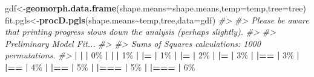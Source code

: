 \documentclass[
]{book}
\newenvironment{Shaded}{\begin{snugshade}}{\end{snugshade}}
\newcommand{\AttributeTok}[1]{\textcolor[rgb]{0.13,0.29,0.53}{#1}}
\newcommand{\CommentTok}[1]{\textcolor[rgb]{0.56,0.35,0.01}{\textit{#1}}}
\newcommand{\DecValTok}[1]{\textcolor[rgb]{0.00,0.00,0.81}{#1}}
\newcommand{\ErrorTok}[1]{\textcolor[rgb]{0.64,0.00,0.00}{\textbf{#1}}}
\newcommand{\FunctionTok}[1]{\textcolor[rgb]{0.13,0.29,0.53}{\textbf{#1}}}
\newcommand{\NormalTok}[1]{#1}
\newcommand{\OtherTok}[1]{\textcolor[rgb]{0.56,0.35,0.01}{#1}}
\newcommand{\SpecialCharTok}[1]{\textcolor[rgb]{0.81,0.36,0.00}{\textbf{#1}}}
\begin{document}
\begin{Shaded}
\begin{Highlighting}[]
\NormalTok{gdf}\OtherTok{\textless{}{-}}\FunctionTok{geomorph.data.frame}\NormalTok{(}\AttributeTok{shape.means=}\NormalTok{shape.means,}\AttributeTok{temp=}\NormalTok{temp,}\AttributeTok{tree=}\NormalTok{tree)}
\NormalTok{fit.pgls}\OtherTok{\textless{}{-}}\FunctionTok{procD.pgls}\NormalTok{(shape.means}\SpecialCharTok{\textasciitilde{}}\NormalTok{temp,tree,}\AttributeTok{data=}\NormalTok{gdf)}
\CommentTok{\#\textgreater{} }
\CommentTok{\#\textgreater{} Please be aware that printing progress slows down the analysis (perhaps slightly).}
\CommentTok{\#\textgreater{} }
\CommentTok{\#\textgreater{} Preliminary Model Fit...}
\CommentTok{\#\textgreater{} }
\CommentTok{\#\textgreater{} Sums of Squares calculations: 1000 permutations.}
\CommentTok{\#\textgreater{} }
  \SpecialCharTok{|}                                                        
  \ErrorTok{|}                                                  \ErrorTok{|}   \DecValTok{0}\NormalTok{\%}
  \SpecialCharTok{|}                                                        
  \ErrorTok{|}                                                  \ErrorTok{|}   \DecValTok{1}\NormalTok{\%}
  \SpecialCharTok{|}                                                        
  \ErrorTok{|=}                                                 \ErrorTok{|}   \DecValTok{1}\NormalTok{\%}
  \SpecialCharTok{|}                                                        
  \ErrorTok{|=}                                                 \ErrorTok{|}   \DecValTok{2}\NormalTok{\%}
  \SpecialCharTok{|}                                                        
  \ErrorTok{|=}                                                 \ErrorTok{|}   \DecValTok{3}\NormalTok{\%}
  \SpecialCharTok{|}                                                        
  \ErrorTok{|==}                                                \ErrorTok{|}   \DecValTok{3}\NormalTok{\%}
  \SpecialCharTok{|}                                                        
  \ErrorTok{|==}                                                \ErrorTok{|}   \DecValTok{4}\NormalTok{\%}
  \SpecialCharTok{|}                                                        
  \ErrorTok{|==}                                                \ErrorTok{|}   \DecValTok{5}\NormalTok{\%}
  \SpecialCharTok{|}                                                        
  \ErrorTok{|===}                                               \ErrorTok{|}   \DecValTok{5}\NormalTok{\%}
  \SpecialCharTok{|}                                                        
  \ErrorTok{|===}                                               \ErrorTok{|}   \DecValTok{6}\NormalTok{\%}

\end{Highlighting}
\end{Shaded}
\end{document}
